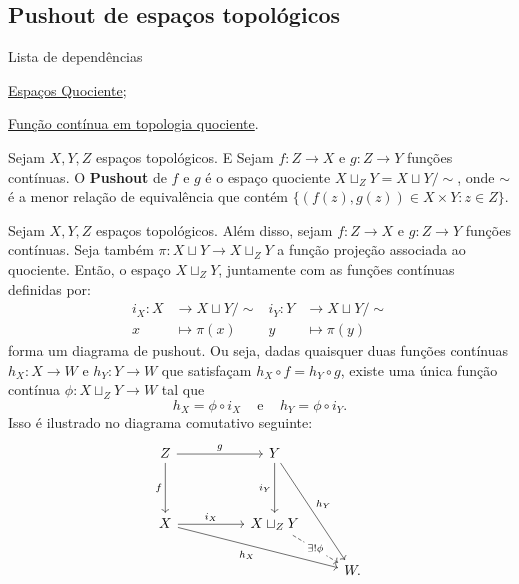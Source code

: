 \subsection{Pushout de espaços topológicos} %
\label{pushout-de-espacos-topologicos-def}
\begin{titlemize}{Lista de dependências}
	\item \hyperref[topologia-quociente-def]{Espaços Quociente};\\ %
    \item \hyperref[funcao-continua-em-topologia-quociente-prop]{Função contínua em topologia quociente}.
\end{titlemize}

\begin{defi}
    Sejam $X,Y,Z$ espaços topológicos. E Sejam $f:Z\rightarrow X$ e $g:Z\rightarrow Y$ funções contínuas. O \textbf{Pushout} de $f$ e $g$ é o espaço quociente $X\sqcup_Z Y=X\sqcup Y/\sim$, onde $\sim$ é a menor relação de equivalência que contém $\{(f(z),g(z))\in X\times Y:z\in Z\}$. 
\end{defi}

\begin{prop}
    Sejam $X,Y,Z$ espaços topológicos. Além disso, sejam $f:Z\rightarrow X$ e $g:Z\rightarrow Y$ funções contínuas. Seja também $\pi:X\sqcup Y\rightarrow X\sqcup_Z Y$ a função projeção associada ao quociente. Então, o espaço $X\sqcup_Z Y$, juntamente com as funções contínuas definidas por:
    \begin{align*}
        i_X:X &\longrightarrow X\sqcup Y/\sim & i_Y:Y&\longrightarrow X\sqcup Y/\sim\\
        x&\longmapsto \pi(x) & y &\longmapsto \pi(y)
    \end{align*}
    forma um diagrama de pushout. Ou seja, dadas quaisquer duas funções contínuas $h_X:X\rightarrow W$ e $h_Y:Y\rightarrow W$ que satisfaçam $h_X\circ f=h_Y\circ g$, existe uma única função contínua 
    $\phi:X\sqcup_Z Y\rightarrow W$ tal que 
    $$h_X=\phi\circ i_X \;\;\;\text{ e }\;\;\; h_Y=\phi\circ i_Y.$$ 
    Isso é ilustrado no diagrama comutativo seguinte:
\[\begin{tikzcd}
	Z && Y \\
	\\
	X && {X\sqcup_Z Y} \\
	&&& W.
	\arrow["g", from=1-1, to=1-3]
	\arrow["f"', from=1-1, to=3-1]
	\arrow["{i_Y}"', from=1-3, to=3-3]
	\arrow["{h_Y}", from=1-3, to=4-4]
	\arrow["{i_X}", from=3-1, to=3-3]
	\arrow["{h_X}"', from=3-1, to=4-4]
	\arrow["{\exists! \phi}"{description}, dashed, from=3-3, to=4-4]
\end{tikzcd}\]
\end{prop}

